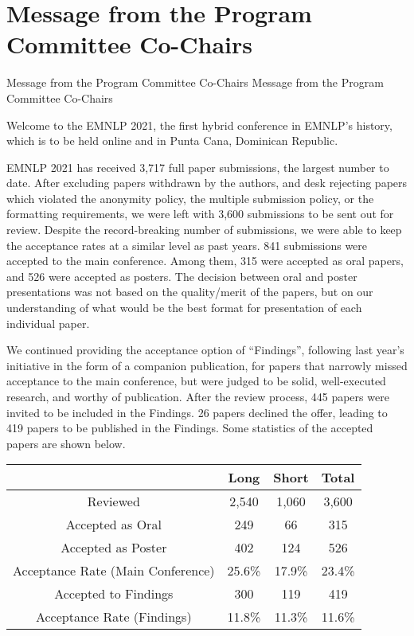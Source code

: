 \section{Message from the Program Committee Co-Chairs}
\setheaders%
    {Message from the Program Committee Co-Chairs}%
    {Message from the Program Committee Co-Chairs}
\thispagestyle{emptyheader}

\setlength{\parskip}{.7ex}


Welcome to the EMNLP 2021, the first hybrid conference in EMNLP's history, which is to be held online and in Punta Cana, Dominican Republic.

EMNLP 2021 has received 3,717 full paper submissions, the largest number to date. After excluding papers withdrawn by the authors, and desk rejecting papers which violated the anonymity policy, the multiple submission policy, or the formatting requirements, we were left with 3,600 submissions to be sent out for review. Despite the record-breaking number of submissions, we were able to keep the acceptance rates at a similar level as past years. 841 submissions were accepted to the main conference. Among them, 315 were accepted as oral papers, and 526 were accepted as posters. The decision between oral and poster presentations was not based on the quality/merit of the papers, but on our understanding of what would be the best format for presentation of each individual paper.

We continued providing the acceptance option of ``Findings'', following last year's initiative in the form of a companion publication, for papers that narrowly missed acceptance to the main conference, but were judged to be solid, well-executed research, and worthy of publication. After the review process, 445 papers were invited to be included in the Findings. 26 papers declined the offer, leading to 419 papers to be published in the Findings. Some statistics of the accepted papers are shown below.


\begin{table}[h]
    \begin{center}
\begin{tabular}[h]{|c|c|c|c|}
\hline
    &Long & Short & Total \\
\hline
    Reviewed & 2,540 &1,060  &3,600   \\
\hline
    Accepted as Oral & 249& 66 & 315   \\
\hline
    Accepted as Poster & 402 & 124 & 526  \\
   \hline
    Acceptance Rate (Main Conference) & 25.6\% & 17.9\% & 23.4\%  \\
\hline
   Accepted to Findings & 300 & 119 & 419  \\
 \hline
    Acceptance Rate (Findings) & 11.8\% & 11.3\% & 11.6\%  \\
\hline
\end{tabular}
    \end{center}
\end{table}

